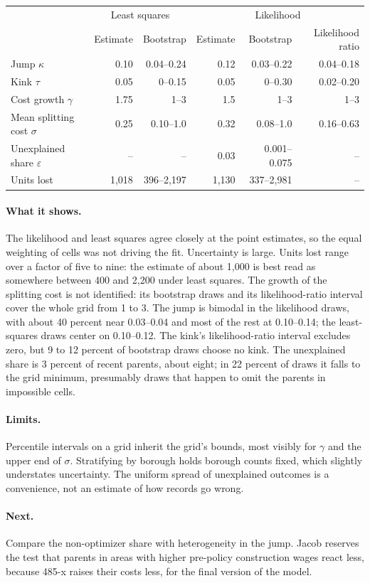 \begin{center}
\small
\begin{tabular}{lrrrrr}
\hline
 & \multicolumn{2}{c}{Least squares} & \multicolumn{3}{c}{Likelihood} \\
 & Estimate & Bootstrap & Estimate & Bootstrap & Likelihood ratio \\
\hline
Jump $\kappa$ & 0.10 & 0.04--0.24 & 0.12 & 0.03--0.22 & 0.04--0.18 \\
Kink $\tau$ & 0.05 & 0--0.15 & 0.05 & 0--0.30 & 0.02--0.20 \\
Cost growth $\gamma$ & 1.75 & 1--3 & 1.5 & 1--3 & 1--3 \\
Mean splitting cost $\sigma$ & 0.25 & 0.10--1.0 & 0.32 & 0.08--1.0 & 0.16--0.63 \\
Unexplained share $\varepsilon$ & -- & -- & 0.03 & 0.001--0.075 & -- \\
Units lost & 1,018 & 396--2,197 & 1,130 & 337--2,981 & -- \\
\hline
\end{tabular}
\end{center}

\paragraph{What it shows.} The likelihood and least squares agree closely at
the point estimates, so the equal weighting of cells was not driving the fit.
Uncertainty is large. Units lost range over a factor of five to nine: the
estimate of about 1,000 is best read as somewhere between 400 and 2,200 under
least squares. The growth of the splitting cost is not identified: its
bootstrap draws and its likelihood-ratio interval cover the whole grid from 1
to 3. The jump is bimodal in the likelihood draws, with about 40 percent near
0.03--0.04 and most of the rest at 0.10--0.14; the least-squares draws center
on 0.10--0.12. The kink's likelihood-ratio interval excludes zero, but 9 to 12
percent of bootstrap draws choose no kink. The unexplained share is 3 percent
of recent parents, about eight; in 22 percent of draws it falls to the grid
minimum, presumably draws that happen to omit the parents in impossible cells.

\paragraph{Limits.} Percentile intervals on a grid inherit the grid's bounds,
most visibly for $\gamma$ and the upper end of $\sigma$. Stratifying by
borough holds borough counts fixed, which slightly understates uncertainty.
The uniform spread of unexplained outcomes is a convenience, not an estimate of
how records go wrong.

\paragraph{Next.} Compare the non-optimizer share with heterogeneity in the
jump. Jacob reserves the test that parents in areas with higher pre-policy
construction wages react less, because 485-x raises their costs less, for the
final version of the model.
